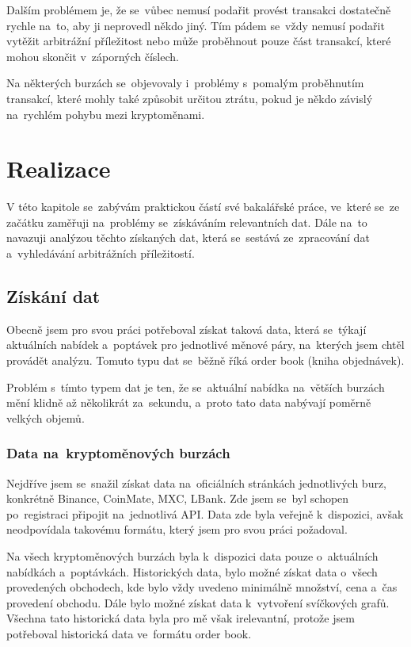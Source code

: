 \documentclass[thesis=B,czech]{FITthesis}[2019/03/21]
\begin{document}
Dalším problémem je, že se~vůbec nemusí podařit provést transakci dostatečně rychle na~to, aby ji neprovedl někdo jiný. Tím pádem se~vždy nemusí podařit vytěžit arbitrážní příležitost nebo může proběhnout pouze část transakcí, které mohou skončit v~záporných číslech.

Na některých burzách se~objevovaly i~problémy s~pomalým proběhnutím transakcí, které mohly také způsobit určitou ztrátu, pokud je někdo závislý na~rychlém pohybu mezi kryptoměnami. \cite{finder}

\chapter{Realizace}
V této kapitole se~zabývám praktickou částí své bakalářské práce, ve~které se~ze začátku zaměřuji na~problémy se~získáváním relevantních dat. Dále na~to navazuji analýzou těchto získaných dat, která se~sestává ze~zpracování dat a~vyhledávání arbitrážních příležitostí.

\section{Získání dat}
Obecně jsem pro svou práci potřeboval získat taková data, která se~týkají aktuálních nabídek a~poptávek pro jednotlivé měnové páry, na~kterých jsem chtěl provádět analýzu. Tomuto typu dat se~běžně říká order book (kniha objednávek).

Problém s~tímto typem dat je ten, že se~aktuální nabídka na~větších burzách mění klidně až několikrát za~sekundu, a~proto tato data nabývají poměrně velkých objemů.

\subsection{Data na~kryptoměnových burzách}
Nejdříve jsem se~snažil získat data na~oficiálních stránkách jednotlivých burz, konkrétně Binance, CoinMate, MXC, LBank. Zde jsem se~byl schopen po~registraci připojit na~jednotlivá API. Data zde byla veřejně k~dispozici, avšak neodpovídala takovému formátu, který jsem pro svou práci požadoval. 

Na všech kryptoměnových burzách byla k~dispozici data pouze o~aktuálních nabídkách a~poptávkách. Historických data, bylo možné získat data o~všech provedených obchodech, kde bylo vždy uvedeno minimálně množství, cena a~čas provedení obchodu. Dále bylo možné získat data k~vytvoření svíčkových grafů. Všechna tato historická data byla pro mě však irelevantní, protože jsem potřeboval historická data ve~formátu order book.
\end{document}
